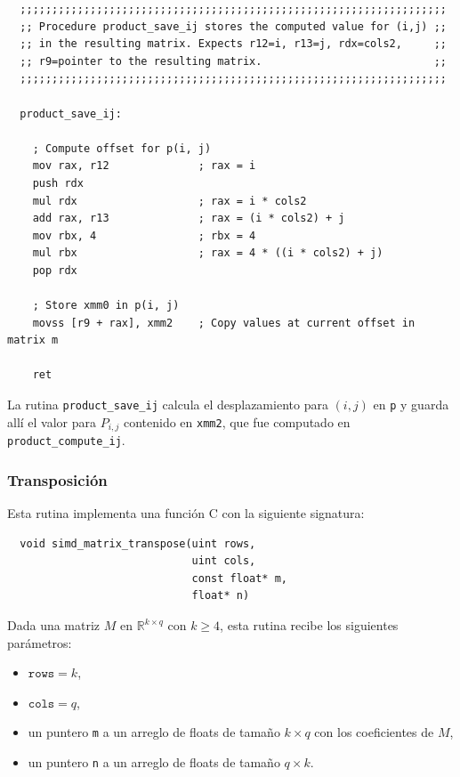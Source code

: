 \documentclass[a4paper, 10pt, twoside]{article}
\newcommand{\cc}[1]{\texttt{#1}}
\begin{document}
\begin{verbatim}
  ;;;;;;;;;;;;;;;;;;;;;;;;;;;;;;;;;;;;;;;;;;;;;;;;;;;;;;;;;;;;;;;;;;;
  ;; Procedure product_save_ij stores the computed value for (i,j) ;;
  ;; in the resulting matrix. Expects r12=i, r13=j, rdx=cols2,     ;;
  ;; r9=pointer to the resulting matrix.                           ;;
  ;;;;;;;;;;;;;;;;;;;;;;;;;;;;;;;;;;;;;;;;;;;;;;;;;;;;;;;;;;;;;;;;;;;

  product_save_ij:

    ; Compute offset for p(i, j)
    mov rax, r12              ; rax = i
    push rdx
    mul rdx                   ; rax = i * cols2
    add rax, r13              ; rax = (i * cols2) + j
    mov rbx, 4                ; rbx = 4
    mul rbx                   ; rax = 4 * ((i * cols2) + j)
    pop rdx

    ; Store xmm0 in p(i, j)
    movss [r9 + rax], xmm2    ; Copy values at current offset in matrix m

    ret
\end{verbatim}

La rutina \cc{product\_save\_ij} calcula el desplazamiento para $(i,j)$ en
\cc{p} y guarda allí el valor para $P_{i,j}$ contenido en \cc{xmm2}, que fue
computado en \cc{product\_compute\_ij}.


\subsubsection{Transposición}

Esta rutina implementa una función C con la siguiente signatura:

\begin{verbatim}
  void simd_matrix_transpose(uint rows,
                             uint cols,
                             const float* m,
                             float* n)
\end{verbatim}

Dada una matriz $M$ en $\mathbb{R}^{k \times q}$ con $k \geq 4$, esta rutina
recibe los siguientes parámetros:

\begin{itemize}
  \item $\cc{rows} = k$,
  \item $\cc{cols} = q$,
  \item un puntero \cc{m} a un arreglo de floats de tamaño $k \times q$ con los
    coeficientes de $M$,
  \item un puntero \cc{n} a un arreglo de floats de tamaño $q \times k$.
\end{itemize}
\end{document}
